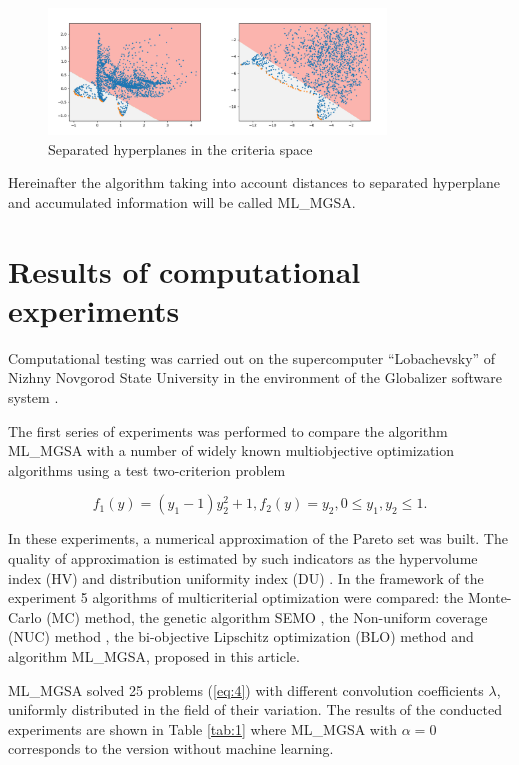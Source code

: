 \documentclass[runningheads]{llncs}
\begin{document}
\begin{figure}[ht]
\includegraphics[width=0.8\textwidth]{fig1.png}
\caption{Separated hyperplanes in the criteria space} \label{fig:1}
\end{figure}

Hereinafter the algorithm taking into account distances to separated hyperplane and accumulated information will be called ML\_MGSA.

\section{Results of computational experiments}

Computational testing was carried out on the supercomputer ``Lobachevsky'' of Nizhny Novgorod State University in the environment of the Globalizer software system \cite{globalizerSystem}. 

The first series of experiments was performed to compare the algorithm ML\_MGSA with a number of widely known multiobjective optimization algorithms using a test two-criterion problem \cite{Evtushenko2014}

\begin{equation}
f_1 (y) = (y_1-1) y_2^2+1, f_2 (y) = y_2, 0\leq y_1, y_2 \leq 1.
\label{eq:6}
\end{equation}

In these experiments, a numerical approximation of the Pareto set was built. The quality of approximation is estimated by such indicators as the hypervolume index (HV) and distribution uniformity index (DU) \cite{Evtushenko2014,Zilinskas2015}. In the framework of the experiment 5 algorithms of multicriterial optimization were compared: the Monte-Carlo (MC) method, the genetic algorithm SEMO \cite{PISA2003}, the Non-uniform coverage (NUC) method \cite{Evtushenko2014}, the bi-objective Lipschitz optimization (BLO) method \cite{Zilinskas2015} and algorithm ML\_MGSA, proposed in this article. 
  
ML\_MGSA solved 25 problems (\ref{eq:4}) with different convolution coefficients $\lambda$, uniformly distributed in the field of their variation. The results of the conducted experiments are shown in Table \ref{tab:1} where ML\_MGSA with $\alpha=0$ corresponds to the version without machine learning.
\end{document}
